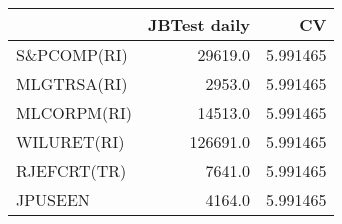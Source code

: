 \begin{tabular}{lrr}
\toprule
{} &  JBTest daily &        CV \\
\midrule
S\&PCOMP(RI) &       29619.0 &  5.991465 \\
MLGTRSA(RI) &        2953.0 &  5.991465 \\
MLCORPM(RI) &       14513.0 &  5.991465 \\
WILURET(RI) &      126691.0 &  5.991465 \\
RJEFCRT(TR) &        7641.0 &  5.991465 \\
JPUSEEN     &        4164.0 &  5.991465 \\
\bottomrule
\end{tabular}

